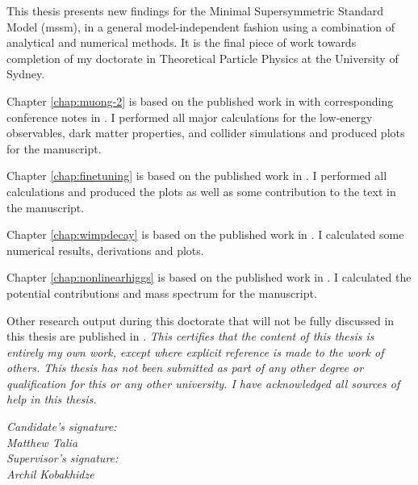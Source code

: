 \begin{declaration}
\noindent
This thesis presents new findings for the Minimal Supersymmetric Standard Model (\acrshort{mssm}), in a general model-independent fashion using a combination of analytical and numerical methods. It is the final piece of work towards completion of my doctorate in Theoretical Particle Physics at the University of Sydney.

Chapter \ref{chap:muong-2} is based on the published work in \cite{RN2} with corresponding conference notes in \cite{RN760}. I performed all major calculations for the low-energy observables, dark matter properties, and collider simulations and produced plots for the manuscript.

Chapter \ref{chap:finetuning} is based on the published work in \cite{RN803}. I performed all calculations and produced the plots as well as some contribution to the text in the manuscript.

Chapter \ref{chap:wimpdecay} is based on the published work in \cite{RN802}. I calculated some numerical results, derivations and plots.

Chapter \ref{chap:nonlinearhiggs} is based on the published work in \cite{RN1}. I calculated the potential contributions and mass spectrum for the manuscript.

Other research output during this doctorate that will not be fully discussed in this thesis are published in \cite{RN763,RN764,RN765}.
\newpage
\hspace{0pt}
\vfill
\textit{This certifies that the content of this thesis is entirely my own work, except where explicit reference is made to the work of others. This thesis has not been submitted as part of any other degree or qualification for this or any other university. I have acknowledged all sources of help in this thesis.}
  \vspace*{1cm}
  \begin{flushright}
  	\textit{Candidate's signature:}\hspace{0.5cm} \makebox[1.5in]{\hrulefill} \\
    \textit{Matthew Talia}\hspace{0.5cm}\, \\
    \vspace*{0.75cm}
    \textit{Supervisor's signature:}\hspace{0.5cm} \makebox[1.5in]{\hrulefill} \\
    \textit{Archil Kobakhidze}\hspace{0.3cm}\,
  \end{flushright}
\vfill
\hspace{0pt}
\end{declaration}

